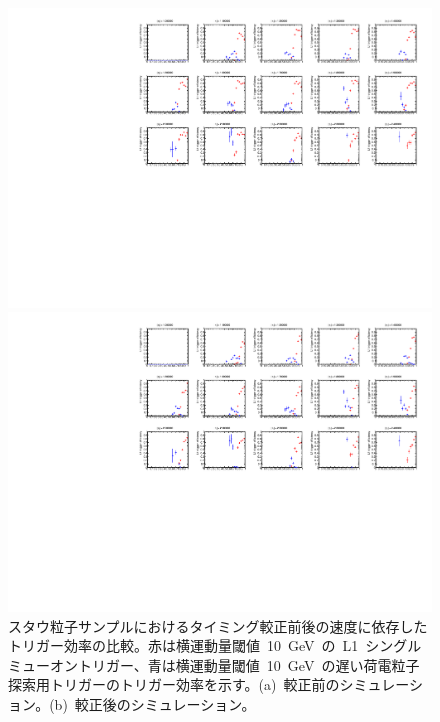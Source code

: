 \begin{figure}[tbp]
    \begin{minipage}{0.49\hsize}
    \centering   
    \includegraphics[width=\textwidth,page=2]{img/rec/stau_600_ori.pdf}
    \subcaption{}
    \end{minipage}
    \begin{minipage}{0.49\hsize}
    \centering   
    \includegraphics[width=\textwidth,page=2]{img/rec/stau_600.pdf}
    \subcaption{}
    \end{minipage}
    \caption[スタウ粒子サンプルにおけるタイミング較正前後の速度に依存したトリガー効率の比較]{スタウ粒子サンプルにおけるタイミング較正前後の速度に依存したトリガー効率の比較。赤は横運動量閾値~10~GeV~の~L1~シングルミューオントリガー、青は横運動量閾値~10~GeV~の遅い荷電粒子探索用トリガーのトリガー効率を示す。(a)~較正前のシミュレーション。(b)~較正後のシミュレーション。}\label{fig:tribeta}
\end{figure}
